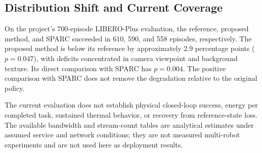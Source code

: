
\subsection{Distribution Shift and Current Coverage}
On the project's 700-episode LIBERO-Plus evaluation, the reference,
proposed method, and SPARC succeeded in 610, 590, and 558 episodes,
respectively. The proposed method is below its reference by approximately
2.9 percentage points ($p=0.047$), with deficits concentrated in camera
viewpoint and background texture. Its direct comparison with SPARC has
$p=0.004$. The positive comparison with SPARC does not remove the
degradation relative to the original policy.

The current evaluation does not establish physical closed-loop success,
energy per completed task, sustained thermal behavior, or recovery from
reference-state loss. The available bandwidth and stream-count tables
are analytical estimates under assumed service and network conditions;
they are not measured multi-robot experiments and are not used here as
deployment results.
